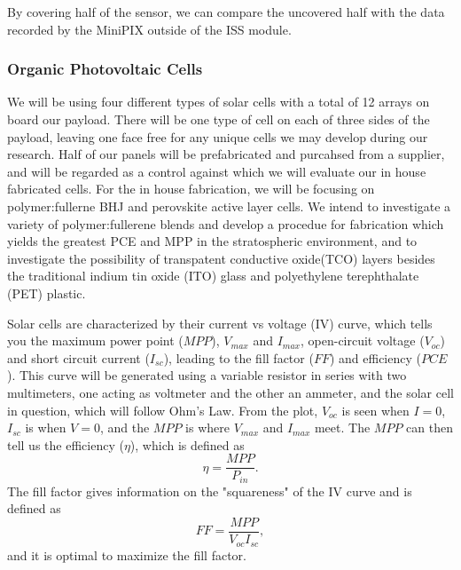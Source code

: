 {By covering half of the sensor, we can compare the uncovered half with the data recorded by the MiniPIX outside of the ISS module.

\subsubsection{Organic Photovoltaic Cells}    
We will be using four different types of solar cells with a total of 12 arrays on board our payload. There will be one type of cell on each of three sides of the payload, leaving one face free for any unique cells we may develop during our research. Half of our panels will be prefabricated and purcahsed from a supplier, and will be regarded as a control against which we will evaluate our in house fabricated cells. For the in house fabrication, we will be focusing on polymer:fullerne BHJ and perovskite active layer cells. We intend to investigate a variety of polymer:fullerene blends and develop a procedue for fabrication which yields the greatest PCE and MPP in the stratospheric environment, and to investigate the possibility of transpatent conductive oxide(TCO) layers besides the traditional indium tin oxide (ITO) glass and polyethylene terephthalate (PET) plastic. \cite{nextgen_TCO}

Solar cells are characterized by their current vs voltage (IV) curve, which tells you the maximum power point ($MPP$), $V_{max}$ and $I_{max}$, open-circuit voltage ($V_{oc}$) and short circuit current ($I_{sc}$), leading to the fill factor ($FF$) and efficiency ($PCE$). This curve will be  generated using a variable resistor in series with two multimeters, one acting as voltmeter and the other an ammeter, and the solar cell in question, which will follow Ohm's Law. From the plot, $V_{oc}$ is seen when $I=0$, $I_{sc}$ is when $V = 0$, and the $MPP$ is where $V_{max}$ and $I_{max}$ meet. The $MPP$ can then tell us the efficiency ($\eta$), which is defined as
\begin{equation}
  \eta = \dfrac{MPP}{P_{in}}.
\end{equation}
The fill factor gives information on the "squareness" of the IV curve and is defined as
\begin{equation}
  FF = \dfrac{MPP}{V_{oc}I_{sc}},
\end{equation}
and it is optimal to maximize the fill factor. \cite{OPV_operation}

}
